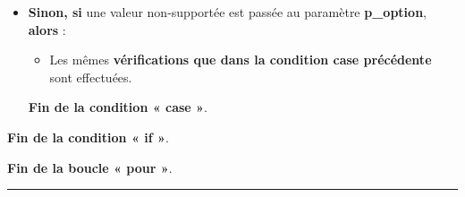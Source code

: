 \documentclass[a4paper,10pt]{article}
\begin{document}
\begin{itemize}
{\begin{itemize}
{\begin{itemize}
{                        \begin{justify}
                            \textbf{\color{cond}Fin de la condition « if »}.
                        \end{justify}
                    }
                \end{itemize}
            }

            \item
            {
                \setlength{\parskip}{2em}

                \begin{justify}
                    \textbf{\color{case}Sinon, si} une valeur non-supportée est passée au paramètre \textbf{\color{vars}p\_option}, \textbf{\color{case}alors} :
                \end{justify}

                \setlength{\parskip}{1em}

                \begin{itemize}
                    \item
                    {
                        \begin{justify}
                            Les mêmes \textbf{\color{cond}vérifications que \color{case}dans la condition case précédente} sont effectuées.
                        \end{justify}
                    }
                \end{itemize}
                
                \begin{justify}
                    \textbf{\color{case}Fin de la condition « case »}.
                \end{justify}
            }
        \end{itemize}

        \begin{justify}
            \textbf{\color{cond}Fin de la condition « if »}.
        \end{justify}
    }
\end{itemize}

\begin{justify}
    \textbf{\color{loop}Fin de la boucle « pour »}.
\end{justify}

\setlength{\parskip}{1em}


\par\noindent\rule{\textwidth}{0.4pt}
\end{document}
